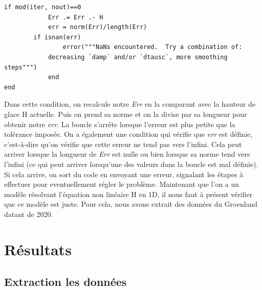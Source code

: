 \documentclass{article}
\begin{document}
\begin{verbatim}
if mod(iter, nout)==0 
            Err .= Err .- H
            err = norm(Err)/length(Err) 
	    if isnan(err)
            	error("""NaNs encountered.  Try a combination of:
            decreasing `damp` and/or `dtausc`, more smoothing steps""")
            end
end
\end{verbatim}
Dans cette condition, on recalcule notre \textit{Err} en la comparant avec la hauteur de glace H actuelle. Puis on prend sa norme et on la divise par sa longueur pour obtenir notre \textit{err}. 
La boucle s'arrête lorsque l'erreur est plus petite que la tolérance imposée.
\newline
On a également une condition qui vérifie que \textit{err} est définie, c'est-à-dire qu'on vérifie que cette erreur ne tend pas vers l'infini. Cela peut arriver lorsque la longueur de \textit{Err} est nulle ou bien lorsque sa norme tend vers l'infini (ce qui peut arriver lorsqu'une des valeurs dans la boucle est mal définie). Si cela arrive, on sort du code en envoyant une erreur, signalant les étapes à effectuer pour eventuellement régler le problème.
\newline\newline
Maintenant que l'on a un modèle résolvant l'équation non linéaire H en 1D, il nous faut à présent vérifier que ce modèle est juste. Pour cela, nous avons extrait des données du Groenland datant de 2020.
\newpage

\section{Résultats}

\subsection{Extraction les données}
\end{document}
